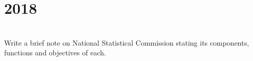 \section*{2018}
\vspace{-.5cm}
\hrulefill \smallskip\\
 Write a brief note on National Statistical Commission stating its components, functions and objectives of each.
